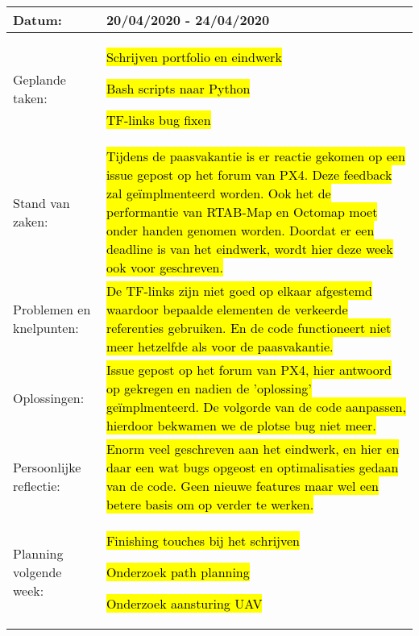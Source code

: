 \begin{tabularx}{\textwidth}{| l | X |}
  \hline
  Datum: & 20/04/2020 - 24/04/2020\\
  \hline
  Geplande taken: &
  \begin{compactitem}
    \item \hl{Schrijven portfolio en eindwerk}
    \item \hl{Bash scripts naar Python}
    \item \hl{TF-links bug fixen}
  \end{compactitem}\\
  \hline
  Stand van zaken: & \hl{Tijdens de paasvakantie is er reactie gekomen op een issue gepost op het forum van PX4. Deze feedback zal ge\"implmenteerd worden. Ook het de performantie van RTAB-Map en Octomap moet onder handen genomen worden. Doordat er een deadline is van het eindwerk, wordt hier deze week ook voor geschreven.}\\
  \hline
  Problemen en knelpunten: & \hl{De TF-links zijn niet goed op elkaar afgestemd waardoor bepaalde elementen de verkeerde referenties gebruiken. En de code functioneert niet meer hetzelfde als voor de paasvakantie.}\\
  \hline
  Oplossingen: & \hl{Issue gepost op het forum van PX4, hier antwoord op gekregen en nadien de 'oplossing' ge\"implmenteerd. De volgorde van de code aanpassen, hierdoor bekwamen we de plotse bug niet meer.}\\
  \hline
  Persoonlijke reflectie: & \hl{Enorm veel geschreven aan het eindwerk, en hier en daar een wat bugs opgeost en optimalisaties gedaan van de code. Geen nieuwe features maar wel een betere basis om op verder te werken.}\\
  \hline
  Planning volgende week: &
  \begin{compactitem}
    \item \hl{Finishing touches bij het schrijven}
    \item \hl{Onderzoek path planning}
    \item \hl{Onderzoek aansturing UAV}
  \end{compactitem}\\
  \hline
\end{tabularx}
